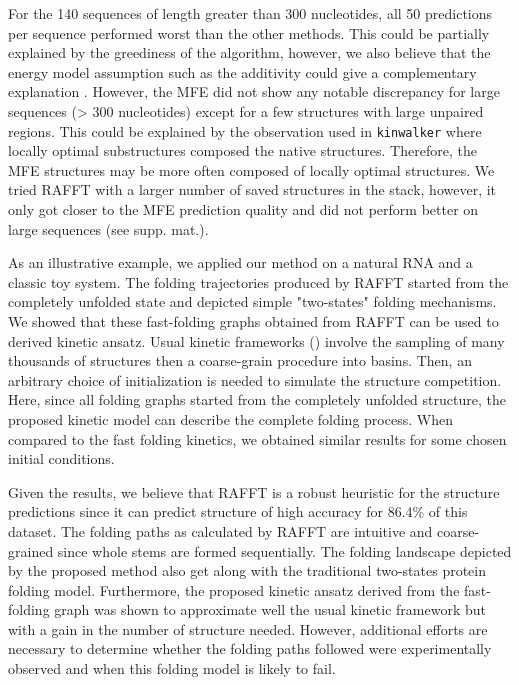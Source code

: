 \documentclass[a4paper,12pt]{article}
\begin{document}
For the 140 sequences of length greater than 300 nucleotides, all 50 predictions
per sequence performed worst than the other methods. This could be partially
explained by the greediness of the algorithm, however, we also believe that the
energy model assumption such as the additivity could give a complementary
explanation \cite{tinoco99_how_rna_folds}. However, the MFE did not show any
notable discrepancy for large sequences (\textgreater{} 300 nucleotides) except for a few
structures with large unpaired regions. This could be explained by the
observation used in \texttt{kinwalker} where locally optimal substructures composed the
native structures. Therefore, the MFE structures may be more often composed of
locally optimal structures. We tried RAFFT with a larger number of saved
structures in the stack, however, it only got closer to the MFE prediction
quality and did not perform better on large sequences (see supp. mat.).

As an illustrative example, we applied our method on a natural RNA and a classic
toy system. The folding trajectories produced by RAFFT started from the
completely unfolded state and depicted simple "two-states" folding mechanisms.
We showed that these fast-folding graphs obtained from RAFFT can be used to
derived kinetic ansatz. Usual kinetic frameworks
(\cite{lorenz20_effic_comput_base_probab_multi_rna_foldin}) involve the sampling
of many thousands of structures then a coarse-grain procedure into basins. Then,
an arbitrary choice of initialization is needed to simulate the structure
competition. Here, since all folding graphs started from the completely unfolded
structure, the proposed kinetic model can describe the complete folding process.
When compared to the fast folding kinetics, we obtained similar results for some
chosen initial conditions.

Given the results, we believe that RAFFT is a robust heuristic for the structure
predictions since it can predict structure of high accuracy for 86.4\% of this
dataset. The folding paths as calculated by RAFFT are intuitive and
coarse-grained since whole stems are formed sequentially. The folding landscape
depicted by the proposed method also get along with the traditional two-states
protein folding model. Furthermore, the proposed kinetic ansatz derived from the
fast-folding graph was shown to approximate well the usual kinetic framework but
with a gain in the number of structure needed. However, additional efforts are
necessary to determine whether the folding paths followed were experimentally
observed and when this folding model is likely to fail.
\end{document}
